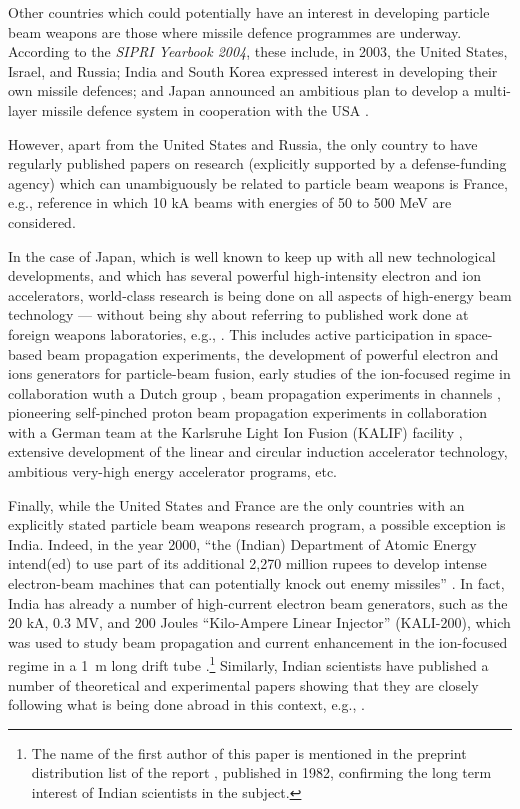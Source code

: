 \documentclass [12pt,a4paper,     ]{report} %
\begin{document}
   Other countries which could potentially have an interest in developing particle beam weapons are those where missile defence programmes are underway.  According to the \emph{SIPRI Yearbook 2004}, these include, in 2003, the United States, Israel, and Russia; India and South Korea expressed interest in developing their own missile defences; and Japan announced an ambitious plan to develop a multi-layer missile defence system in cooperation with the USA \cite{SIPRI2004-}.  

   However, apart from the United States and Russia, the only country to have regularly published papers on research (explicitly supported by a defense-funding agency) which can unambiguously be related to particle beam weapons is France, e.g., reference \cite{BOUCH1988-} in which 10 kA beams with energies of 50 to 500 MeV are considered.

   In the case of Japan, which is well known to keep up with all new technological developments, and which has several powerful high-intensity electron and ion accelerators, world-class research is being done on all aspects of high-energy beam technology --- without being shy about referring to published work done at foreign weapons laboratories, e.g., \cite{TAKA1988-}.  This includes active participation in space-based beam propagation experiments, the development of powerful electron and ions generators for particle-beam fusion, early studies of the ion-focused regime in collaboration wuth a Dutch group \cite{YAMAG1982-}, beam propagation experiments in channels \cite{OZAKI1985-}, pioneering self-pinched proton beam propagation experiments in collaboration with a German team at the Karlsruhe Light Ion Fusion (KALIF) facility \cite{HOPPE1996-}, extensive development of the linear and circular induction accelerator technology, ambitious very-high energy accelerator programs, etc.

  Finally, while the United States and France are the only countries with an explicitly stated particle beam weapons research program, a possible exception is India.  Indeed, in the year 2000, ``the (Indian) Department of Atomic Energy intend(ed) to use part of its additional 2,270 million rupees to develop intense electron-beam machines that can potentially knock out enemy missiles'' \cite{JAYAR2000-}.  In fact, India has already a number of high-current electron beam generators, such as the 20 kA, 0.3 MV, and 200 Joules ``Kilo-Ampere Linear Injector'' (KALI-200), which was used to study beam propagation and current enhancement in the ion-focused regime in a 1~m long drift tube \cite{PAITH1988-}.\footnote{The name of the first author of this paper is mentioned in the preprint distribution list of the report \cite{UHM--1982R}, published in 1982, confirming the long term interest of Indian scientists in the subject.}  Similarly, Indian scientists have published a number of theoretical and experimental papers showing that they are closely following what is being done abroad in this context, e.g., \cite{IYYEN1989-,VENUG1992-}. 
\end{document}
